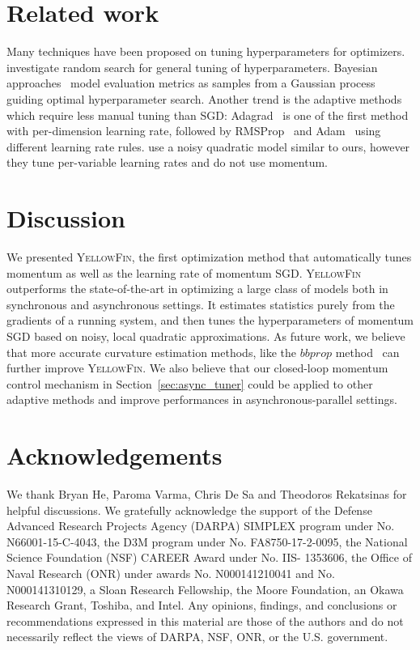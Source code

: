 \documentclass{article}
\newcommand{\tuner}{\textsc{YellowFin}\xspace}
\begin{document}
\section{Related work}
\label{sec:related}
\vspace{-0.3em}
Many techniques have been proposed on tuning hyperparameters for optimizers.~\citet{bergstra2012random} investigate random search for general tuning of  hyperparameters. 
Bayesian approaches~\cite{snoek2012practical} model evaluation metrics as samples from a Gaussian process guiding optimal hyperparameter search. 
Another trend is the adaptive methods which require less manual tuning than SGD:
Adagrad~\cite{duchi2011adaptive} is one of the first method with per-dimension learning rate, followed by RMSProp~\cite{tieleman2012lecture} and Adam~\cite{chilimbi2014project} using different learning rate rules. 
\citet{schaul2013no} use a noisy quadratic model similar to ours,
however they tune per-variable learning rates and 
do not use momentum.


\vspace{-0.25em}
\section{Discussion}
\label{sec:discussion}
\vspace{-0.3em}
We presented \tuner, the first optimization method that automatically tunes momentum as well as the learning rate of momentum SGD. 
\tuner outperforms the state-of-the-art in optimizing a large class of models both in synchronous and asynchronous settings.
It estimates statistics purely from the gradients of a running system,
and then tunes the hyperparameters of momentum SGD based on noisy, local quadratic approximations.
As future work, we believe that more accurate curvature estimation methods,
like the $bbprop$ method~\cite{martens2012estimating} can further improve \tuner.
We also believe that our closed-loop momentum control mechanism in Section~\ref{sec:async_tuner} 
could be applied to other adaptive methods and improve performances in asynchronous-parallel settings.


\section{Acknowledgements}
We thank Bryan He, Paroma Varma, Chris De Sa and Theodoros Rekatsinas for helpful discussions. We gratefully acknowledge the support of the Defense Advanced Research Projects Agency (DARPA) SIMPLEX program under No. N66001-15-C-4043, the D3M program under No. FA8750-17-2-0095, the National Science Foundation (NSF) CAREER Award under No. IIS- 1353606, the Office of Naval Research (ONR) under awards No. N000141210041 and No. N000141310129, a Sloan Research Fellowship, the Moore Foundation, an Okawa Research Grant, Toshiba, and Intel. Any opinions, findings, and conclusions or recommendations expressed in this material are those of the authors and do not necessarily reflect the views of DARPA, NSF, ONR, or the U.S. government.





\appendix 

%
%

%


%
\end{document}
